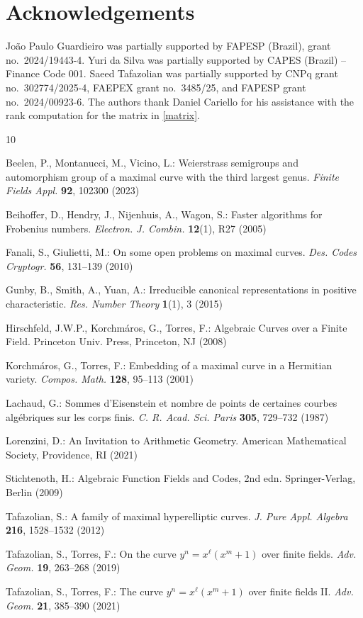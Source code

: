 \documentclass[12pt]{amsart}
\theoremstyle{remark}
\theoremstyle{definition}
\begin{document}
	\section*{Acknowledgements}
João Paulo Guardieiro was partially supported by FAPESP (Brazil), 
grant no.\ 2024/19443-4. Yuri da Silva was partially supported by 
CAPES (Brazil) -- Finance Code 001. Saeed Tafazolian was partially 
supported by CNPq grant no.\ 302774/2025-4, FAEPEX grant no.\ 3485/25, 
and FAPESP grant no.\ 2024/00923-6. The authors thank Daniel Cariello 
for his assistance with the rank computation for the matrix in 
\eqref{matrix}.
\begin{thebibliography}{10}

Beelen, P., Montanucci, M., Vicino, L.:
Weierstrass semigroups and automorphism group of a maximal curve
with the third largest genus.
\emph{Finite Fields Appl.} \textbf{92}, 102300 (2023)

Beihoffer, D., Hendry, J., Nijenhuis, A., Wagon, S.:
Faster algorithms for Frobenius numbers.
\emph{Electron. J. Combin.} \textbf{12}(1), R27 (2005)

Fanali, S., Giulietti, M.:
On some open problems on maximal curves.
\emph{Des. Codes Cryptogr.} \textbf{56}, 131--139 (2010)

Gunby, B., Smith, A., Yuan, A.:
Irreducible canonical representations in positive characteristic.
\emph{Res. Number Theory} \textbf{1}(1), 3 (2015)

Hirschfeld, J.W.P., Korchmáros, G., Torres, F.:
Algebraic Curves over a Finite Field.
Princeton Univ. Press, Princeton, NJ (2008)

Korchmáros, G., Torres, F.:
Embedding of a maximal curve in a Hermitian variety.
\emph{Compos. Math.} \textbf{128}, 95--113 (2001)

Lachaud, G.:
Sommes d'Eisenstein et nombre de points de certaines courbes
algébriques sur les corps finis.
\emph{C. R. Acad. Sci. Paris} \textbf{305}, 729--732 (1987)

Lorenzini, D.:
An Invitation to Arithmetic Geometry.
American Mathematical Society, Providence, RI (2021)

Stichtenoth, H.:
Algebraic Function Fields and Codes, 2nd edn.
Springer-Verlag, Berlin (2009)

Tafazolian, S.:
A family of maximal hyperelliptic curves.
\emph{J. Pure Appl. Algebra} \textbf{216}, 1528--1532 (2012)

Tafazolian, S., Torres, F.:
On the curve $y^n = x^{\ell}(x^m+1)$ over finite fields.
\emph{Adv. Geom.} \textbf{19}, 263--268 (2019)

Tafazolian, S., Torres, F.:
The curve $y^n = x^{\ell}(x^m+1)$ over finite fields II.
\emph{Adv. Geom.} \textbf{21}, 385--390 (2021)

\end{thebibliography}
    
\end{document}
